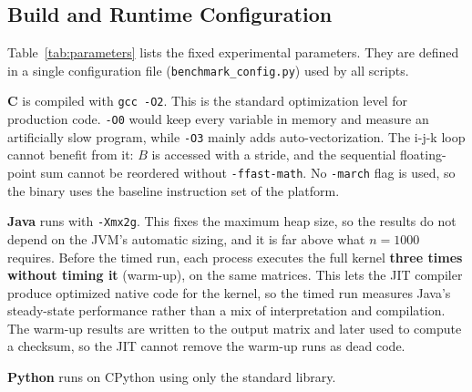 \documentclass[conference,a4paper]{IEEEtran}
\newcommand{\code}[1]{\texttt{#1}}
\begin{document}
\subsection{Build and Runtime Configuration}
Table~\ref{tab:parameters} lists the fixed experimental parameters. They are
defined in a single configuration file (\code{benchmark\_\allowbreak config.py}) used by
all scripts.

\textbf{C} is compiled with \code{gcc -O2}. This is the standard optimization
level for production code. \code{-O0} would keep every variable in memory and
measure an artificially slow program, while \code{-O3} mainly adds
auto-vectorization. The i-j-k loop cannot benefit from it: $B$ is accessed with
a stride, and the sequential floating-point sum cannot be reordered without
\code{-ffast-math}. No \code{-march} flag is used, so the binary uses the
baseline instruction set of the platform.

\textbf{Java} runs with \code{-Xmx2g}. This fixes the maximum heap size, so
the results do not depend on the JVM's automatic sizing, and it is far above
what $n=1000$ requires. Before the timed run, each process executes the full
kernel \textbf{three times without timing it} (warm-up), on the same matrices.
This lets the JIT compiler produce optimized native code for the kernel, so
the timed run measures Java's steady-state performance rather than a mix of
interpretation and compilation. The warm-up results are written to the output
matrix and later used to compute a checksum, so the JIT cannot remove the
warm-up runs as dead code.

\textbf{Python} runs on CPython using only the standard library.
\end{document}
